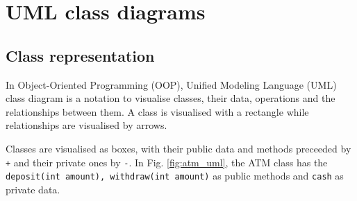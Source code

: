 \documentclass[a4paper]{article}
\begin{document}






\newpage
\tableofcontents
\newpage



\section{UML class diagrams}

\subsection{Class representation}
In Object-Oriented Programming (OOP), Unified Modeling Language (UML) class diagram is a notation to visualise classes, their data, operations and the relationships between them. A class is visualised with a rectangle while relationships are visualised by arrows.

Classes are visualised as boxes, with their public data and methods preceeded by \texttt{+} and their private ones by \texttt{-}. In Fig. \ref{fig:atm_uml}, the ATM class has the \texttt{deposit(int amount), withdraw(int amount)} as public methods and \texttt{cash} as private data.
\end{document}
